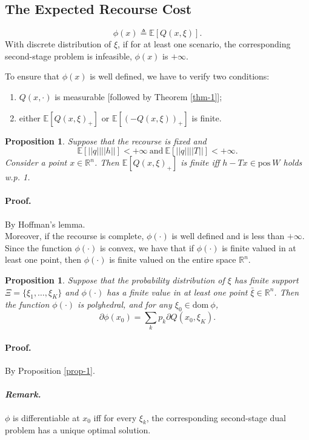 \documentclass[a4pper,11pt]{article}
\newtheorem{prop}[thm]{Proposition}
\begin{document}
\subsection{The Expected Recourse Cost}
$$\phi(x)\triangleq \mathbb E[Q(x,\xi)].$$
With discrete distribution of $\xi$, if for at least one scenario, the corresponding second-stage problem is infeasible, $\phi(x)$ is $+\infty$.

To ensure that $\phi(x)$ is well defined, we have to verify two conditions:
\begin{enumerate}
\item $Q(x,\cdot)$ is measurable [followed by Theorem \ref{thm-1}];
\item either $\mathbb E[Q(x,\xi)_+]$ or $\mathbb E[(-Q(x,\xi))_+]$  is finite.
\end{enumerate}
\begin{prop}
Suppose that the recourse is fixed and 
$$\mathbb E[||q||||h||]<+\infty \ \text{and} \ \mathbb E[||q||||T||]<+\infty.$$
Consider a point $x\in \mathbb R^n$. Then $\mathbb E[Q(x,\xi)_+]$ is finite iff $h-Tx\in \text{pos}\ W$ holds w.p. 1.
\end{prop}
\paragraph{Proof.} By Hoffman's lemma.\\

Moreover, if the recourse is complete, $\phi(\cdot)$ is well deﬁned and is less than $+\infty$. Since the function $\phi(\cdot)$ is convex, we have that if $\phi(\cdot)$ is ﬁnite valued in at least one point, then $\phi(\cdot)$ is ﬁnite valued on the entire space $\mathbb R^n$.
\begin{prop}
Suppose that the probability distribution of $\xi$ has finite support $\Xi=\{\xi_1,\dots, \xi_K\}$ and $\phi(\cdot)$ has a finite value in at least one point $\bar \xi\in \mathbb R^n$. Then the function $\phi(\cdot)$ is polyhedral, and for any $\xi_0\in \text{dom} \ \phi$,
$$\partial \phi(x_0)=\sum_{k}p_k\partial Q(x_0,\xi_K).$$ 
\end{prop}
\paragraph{Proof.} By Proposition \ref{prop-1}.
\paragraph{\textit{Remark.}} $\phi$ is differentiable at $x_0$ iff for every $\xi_k$, the corresponding second-stage dual problem has a unique optimal solution.
\end{document}

